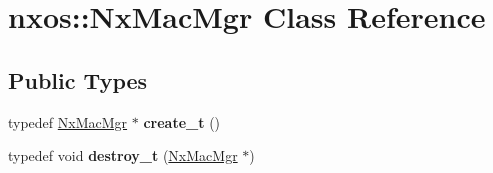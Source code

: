 \hypertarget{classnxos_1_1NxMacMgr}{\section{nxos\-:\-:Nx\-Mac\-Mgr Class Reference}
\label{classnxos_1_1NxMacMgr}
}
\subsection*{Public Types}
\begin{DoxyCompactItemize}
\item 
\hypertarget{classnxos_1_1NxMacMgr_aa8362618f4a46ddd4b1e9ee36bcb57f1}{typedef \hyperlink{classnxos_1_1NxMacMgr}{Nx\-Mac\-Mgr} $\ast$ {\bfseries create\-\_\-t} ()}\label{classnxos_1_1NxMacMgr_aa8362618f4a46ddd4b1e9ee36bcb57f1}

\item 
\hypertarget{classnxos_1_1NxMacMgr_a9f136eb600efde35084168da3d9b2f3d}{typedef void {\bfseries destroy\-\_\-t} (\hyperlink{classnxos_1_1NxMacMgr}{Nx\-Mac\-Mgr} $\ast$)}\label{classnxos_1_1NxMacMgr_a9f136eb600efde35084168da3d9b2f3d}

\end{DoxyCompactItemize}
